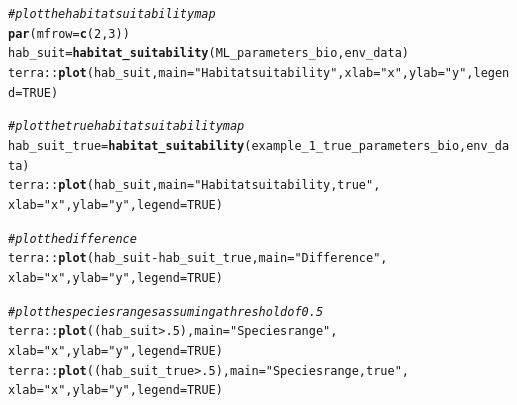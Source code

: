 \documentclass[11pt]{article}\usepackage[]{graphicx}\usepackage[]{xcolor}
\makeatletter
\newcommand{\hlnum}[1]{\textcolor[rgb]{0.686,0.059,0.569}{#1}}%
\newcommand{\hlsng}[1]{\textcolor[rgb]{0.192,0.494,0.8}{#1}}%
\newcommand{\hlcom}[1]{\textcolor[rgb]{0.678,0.584,0.686}{\textit{#1}}}%
\newcommand{\hlopt}[1]{\textcolor[rgb]{0,0,0}{#1}}%
\newcommand{\hldef}[1]{\textcolor[rgb]{0.345,0.345,0.345}{#1}}%
\newcommand{\hlkwb}[1]{\textcolor[rgb]{0.69,0.353,0.396}{#1}}%
\newcommand{\hlkwc}[1]{\textcolor[rgb]{0.333,0.667,0.333}{#1}}%
\newcommand{\hlkwd}[1]{\textcolor[rgb]{0.737,0.353,0.396}{\textbf{#1}}}%
\newenvironment{kframe}{%
 \def\at@end@of@kframe{}%
 \ifinner\ifhmode%
  \def\at@end@of@kframe{\end{minipage}}%
  \begin{minipage}{\columnwidth}%
 \fi\fi%
 \def\FrameCommand##1{\hskip\@totalleftmargin \hskip-\fboxsep
 \colorbox{shadecolor}{##1}\hskip-\fboxsep
     \hskip-\linewidth \hskip-\@totalleftmargin \hskip\columnwidth}%
 \MakeFramed {\advance\hsize-\width
   \@totalleftmargin\z@ \linewidth\hsize
   \@setminipage}}%
 {\par\unskip\endMakeFramed%
 \at@end@of@kframe}
\newenvironment{knitrout}{}{} %
\makeatother
\begin{document}
\begin{knitrout}
\color{fgcolor}\begin{kframe}
\begin{alltt}
\hlcom{#plot the habitat suitability map}
\hlkwd{par}\hldef{(}\hlkwc{mfrow} \hldef{=} \hlkwd{c}\hldef{(}\hlnum{2}\hldef{,}\hlnum{3}\hldef{))}
\hldef{hab_suit} \hlkwb{=} \hlkwd{habitat_suitability}\hldef{(ML_parameters_bio, env_data)}
\hldef{terra}\hlopt{::}\hlkwd{plot}\hldef{(hab_suit,}\hlkwc{main}\hldef{=}\hlsng{"Habitat suitability"}\hldef{,}\hlkwc{xlab}\hldef{=}\hlsng{"x"}\hldef{,}\hlkwc{ylab}\hldef{=}\hlsng{"y"}\hldef{,}\hlkwc{legend}\hldef{=}\hlnum{TRUE}\hldef{)}

\hlcom{#plot the true habitat suitability map}
\hldef{hab_suit_true} \hlkwb{=} \hlkwd{habitat_suitability}\hldef{(example_1_true_parameters_bio,env_data)}
\hldef{terra}\hlopt{::}\hlkwd{plot}\hldef{(hab_suit,}\hlkwc{main}\hldef{=}\hlsng{"Habitat suitability, true"}\hldef{,}
            \hlkwc{xlab}\hldef{=}\hlsng{"x"}\hldef{,}\hlkwc{ylab}\hldef{=}\hlsng{"y"}\hldef{,}\hlkwc{legend}\hldef{=}\hlnum{TRUE}\hldef{)}

\hlcom{#plot the difference}
\hldef{terra}\hlopt{::}\hlkwd{plot}\hldef{(hab_suit}\hlopt{-}\hldef{hab_suit_true,}\hlkwc{main}\hldef{=}\hlsng{"Difference"}\hldef{,}
            \hlkwc{xlab}\hldef{=}\hlsng{"x"}\hldef{,}\hlkwc{ylab}\hldef{=}\hlsng{"y"}\hldef{,}\hlkwc{legend}\hldef{=}\hlnum{TRUE}\hldef{)}

\hlcom{#plot the species ranges assuming a threshold of 0.5}
\hldef{terra}\hlopt{::}\hlkwd{plot}\hldef{((hab_suit}\hlopt{>}\hlnum{.5}\hldef{),}\hlkwc{main}\hldef{=}\hlsng{"Species range"}\hldef{,}
            \hlkwc{xlab}\hldef{=}\hlsng{"x"}\hldef{,}\hlkwc{ylab}\hldef{=}\hlsng{"y"}\hldef{,}\hlkwc{legend}\hldef{=}\hlnum{TRUE}\hldef{)}
\hldef{terra}\hlopt{::}\hlkwd{plot}\hldef{((hab_suit_true}\hlopt{>}\hlnum{.5}\hldef{),}\hlkwc{main}\hldef{=}\hlsng{"Species range, true"}\hldef{,}
            \hlkwc{xlab}\hldef{=}\hlsng{"x"}\hldef{,}\hlkwc{ylab}\hldef{=}\hlsng{"y"}\hldef{,}\hlkwc{legend}\hldef{=}\hlnum{TRUE}\hldef{)}


\end{alltt}
\end{kframe}
\end{knitrout}
\end{document}
